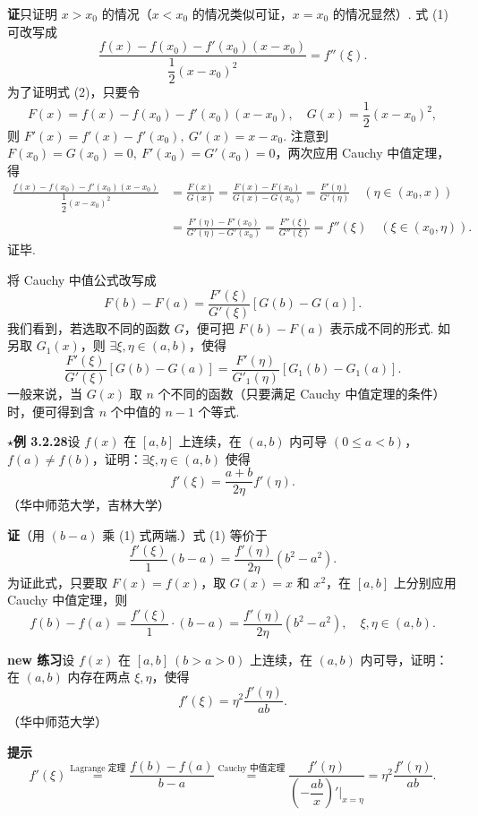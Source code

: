 \documentclass[UTF8,12pt,a4paper,fontset=fandol]{ctexart}
\begin{document}
\noindent\textbf{证}\quad 只证明 $x>x_0$ 的情况（$x<x_0$ 的情况类似可证，$x=x_0$ 的情况显然）. 式 (1) 可改写成
\begin{equation}
  \frac{f(x)-f(x_0)-f'(x_0)(x-x_0)}
  {\dfrac12(x-x_0)^2}=f''(\xi).
\tag{2}
\end{equation}
为了证明式 (2)，只要令
\[
  F(x)=f(x)-f(x_0)-f'(x_0)(x-x_0),\quad
  G(x)=\frac12(x-x_0)^2,
\]
则 $F'(x)=f'(x)-f'(x_0),\ G'(x)=x-x_0$.
注意到 $F(x_0)=G(x_0)=0,\ F'(x_0)=G'(x_0)=0$，两次应用 Cauchy 中值定理，得
\[
\begin{aligned}
\frac{f(x)-f(x_0)-f'(x_0)(x-x_0)}
{\dfrac12(x-x_0)^2}
&=\frac{F(x)}{G(x)}
=\frac{F(x)-F(x_0)}{G(x)-G(x_0)}
=\frac{F'(\eta)}{G'(\eta)}\quad(\eta\in(x_0,x))\\
&=\frac{F'(\eta)-F'(x_0)}{G'(\eta)-G'(x_0)}
=\frac{F''(\xi)}{G''(\xi)}
=f''(\xi)\quad(\xi\in(x_0,\eta)).
\end{aligned}
\]
证毕.

将 Cauchy 中值公式改写成
\[
  F(b)-F(a)=\frac{F'(\xi)}{G'(\xi)}[G(b)-G(a)].
\]
我们看到，若选取不同的函数 $G$，便可把 $F(b)-F(a)$ 表示成不同的形式. 如另取 $G_1(x)$，则 $\exists\xi,\eta\in(a,b)$，使得
\[
  \frac{F'(\xi)}{G'(\xi)}[G(b)-G(a)]
  =
  \frac{F'(\eta)}{G'_1(\eta)}[G_1(b)-G_1(a)].
\]
一般来说，当 $G(x)$ 取 $n$ 个不同的函数（只要满足 Cauchy 中值定理的条件）时，便可得到含 $n$ 个中值的 $n-1$ 个等式.

\noindent\textbf{$\star$例 3.2.28}\quad 设 $f(x)$ 在 $[a,b]$ 上连续，在 $(a,b)$ 内可导 $(0\le a<b)$，$f(a)\ne f(b)$，证明：$\exists\xi,\eta\in(a,b)$ 使得
\begin{equation}
  f'(\xi)=\frac{a+b}{2\eta}f'(\eta).
\tag{1}
\end{equation}
（华中师范大学，吉林大学）

\noindent\textbf{证}\quad （用 $(b-a)$ 乘 (1) 式两端.）式 (1) 等价于
\begin{equation}
  \frac{f'(\xi)}1(b-a)=\frac{f'(\eta)}{2\eta}(b^2-a^2).
\tag{2}
\end{equation}
为证此式，只要取 $F(x)=f(x)$，取 $G(x)=x$ 和 $x^2$，在 $[a,b]$ 上分别应用 Cauchy 中值定理，则
\[
  f(b)-f(a)=\frac{f'(\xi)}1\cdot(b-a)=\frac{f'(\eta)}{2\eta}(b^2-a^2),\quad \xi,\eta\in(a,b).
\]

\noindent\textbf{new 练习}\quad 设 $f(x)$ 在 $[a,b]\ (b>a>0)$ 上连续，在 $(a,b)$ 内可导，证明：在 $(a,b)$ 内存在两点 $\xi,\eta$，使得
\[
  f'(\xi)=\eta^2\frac{f'(\eta)}{ab}.
\]
（华中师范大学）

\noindent\textbf{提示}\quad
\[
  f'(\xi)\stackrel{\text{Lagrange 定理}}{=}\frac{f(b)-f(a)}{b-a}
  \stackrel{\text{Cauchy 中值定理}}{=}
  \frac{f'(\eta)}{\left(-\dfrac{ab}{x}\right)'\big|_{x=\eta}}
  =\eta^2\frac{f'(\eta)}{ab}.
\]
\end{document}
